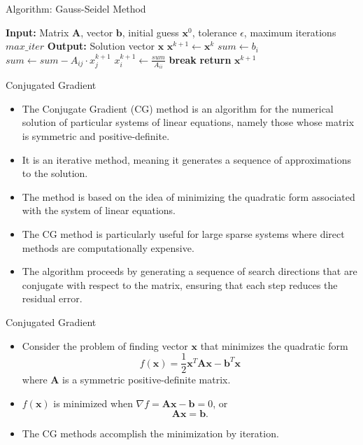 \documentclass{beamer}
\begin{document}
\begin{frame}[fragile]{Algorithm: Gauss-Seidel Method}
\begin{algorithm}[H]
\caption{Gauss-Seidel Method}
\begin{algorithmic}[1]
\State \textbf{Input:} Matrix $\mathbf{A}$, vector $\mathbf{b}$, initial guess $\mathbf{x}^0$, tolerance $\epsilon$, maximum iterations $max\_iter$
\State \textbf{Output:} Solution vector $\mathbf{x}$
    \State $\mathbf{x}^{k+1} \gets \mathbf{x}^k$
        \State $sum \gets b_i$
                \State $sum \gets sum - A_{ij} \cdot x_j^{k+1}$
            \EndIf
        \EndFor
        \State $x_i^{k+1} \gets \frac{sum}{A_{ii}}$
    \EndFor
        \State \textbf{break}
    \EndIf
\EndFor
\State \textbf{return} $\mathbf{x}^{k+1}$
\end{algorithmic}
\end{algorithm}
\end{frame}
\begin{frame}{Conjugated Gradient}

    \begin{itemize}
        \item The Conjugate Gradient (CG) method is an algorithm for the numerical solution of particular systems of linear equations, namely those whose matrix is symmetric and positive-definite.
        \item It is an iterative method, meaning it generates a sequence of approximations to the solution.
        \item The method is based on the idea of minimizing the quadratic form associated with the system of linear equations.
        \item The CG method is particularly useful for large sparse systems where direct methods are computationally expensive.
        \item The algorithm proceeds by generating a sequence of search directions that are conjugate with respect to the matrix, ensuring that each step reduces the residual error.
       
    \end{itemize}

\end{frame}
\begin{frame}{Conjugated Gradient}
    \begin{itemize}
        \item Consider the problem of finding vector $\mathbf{x}$ that minimizes the quadratic form
        $$
f(\mathbf{x})=\frac{1}{2} \mathbf{x}^T \mathbf{A x}-\mathbf{b}^T \mathbf{x}
$$
where $\mathbf{A}$ is a symmetric positive-definite matrix.
\item $f(\mathbf{x})$ is minimized when $\nabla f=\mathbf{A x}-\mathbf{b}=0$, or  
\[ 
\mathbf{A x}=\mathbf{b}.
\]
\item The CG methods accomplish the minimization by iteration.
    \end{itemize}

\end{frame}
\end{document}
